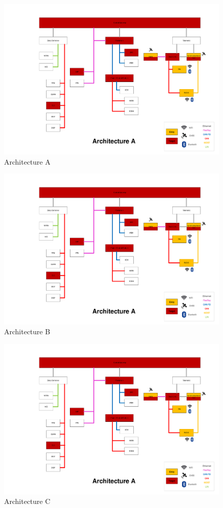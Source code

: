 \begin{figure}[h]
    \centering
    \includegraphics[width=\textwidth, page=1]{../ArchitecturesFINAL2.pdf}
    \caption{Architecture A}
    \label{fig:architectureA}
\end{figure}

\begin{figure}[h]
    \centering
    \includegraphics[width=\textwidth, page=2]{../ArchitecturesFINAL2.pdf}
    \caption{Architecture B}
    \label{fig:architectureB}
\end{figure}

\begin{figure}[h]
    \centering
    \includegraphics[width=\textwidth, page=3]{../ArchitecturesFINAL2.pdf}
    \caption{Architecture C}
    \label{fig:architectureC}
\end{figure}
